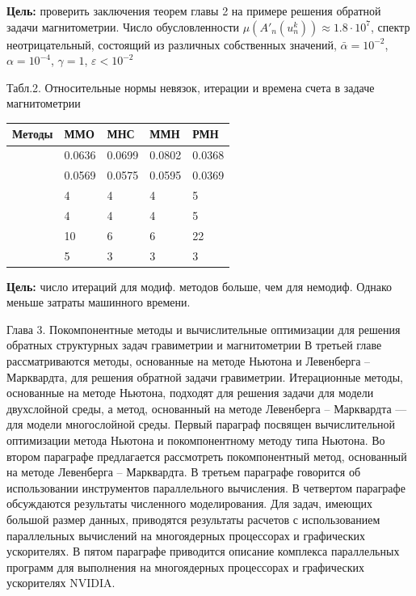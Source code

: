 \documentclass[10pt,pdf, mathserif, hyperref={unicode}]{beamer}
\begin{document}
\begin{frame}{}
	\textbf{\color{blue}Цель:} проверить заключения теорем главы 2 на примере решения обратной задачи магнитометрии.
	Число обусловленности $\mu(A'_n(u_n^k))\approx 1.8\cdot 10^7$, спектр неотрицательный, состоящий из различных собственных значений, $\bar\alpha=10^{-2}$, $\alpha = 10^{-4}$, $\gamma=1$, $\varepsilon < 10^{-2}$
	
	\begin{table}
		\centering
		{\scriptsize Табл.2. Относительные нормы невязок, итерации и времена счета в задаче магнитометрии}
		
		\smallskip
		\begin{tabular}{|p{}|p{}|p{}|p{}|p{}|}
			\hline
			\rule{0cm}{0.5cm}
			Методы & ММО & МНС & ММН & РМН \\ \hline
			\rule{0cm}{0.5cm}
			\multirow{$\Delta$} & 0.0636 & 0.0699 & 0.0802 & 0.0368	 \\ \cline{2-5} 
			\rule{0cm}{0.5cm}
			&  0.0569   & 0.0575    &  0.0595   &  0.0369   \\ \hline
			\rule{0cm}{0.5cm}
			\multirow{$N$} & 4  &  4   &   4  &  5    \\ \cline{2-5}
			\rule{0cm}{0.5cm}
			&  4   &   4  &  4   &  5   \\ \hline
			\rule{0cm}{0.5cm}
			\multirow{$T$ (сек)}    &  10   &  6   &  6  & 22    \\ \cline{2-5}
			\rule{0cm}{0.5cm}
			& 5    & 3    &  3   &   3  \\ \hline
		\end{tabular}
	\end{table}
	\textbf{\color{blue}Цель:} число итераций для модиф. методов больше, чем для немодиф. Однако меньше затраты машинного времени.
\end{frame}
\begin{frame}{Глава 3. Покомпонентные методы и вычислительные оптимизации для решения обратных структурных задач гравиметрии и магнитометрии}
	В третьей главе рассматриваются методы, основанные на методе Ньютона и Левенберга -- Марквардта, для решения обратной задачи гравиметрии. Итерационные методы, основанные на методе Ньютона, подходят для решения задачи для модели двухслойной среды, а метод, основанный на методе Левенберга -- Марквардта --- для модели многослойной среды. Первый параграф посвящен вычислительной оптимизации метода Ньютона и покомпонентному методу типа Ньютона. Во втором параграфе предлагается рассмотреть покомпонентный метод, основанный на методе Левенберга -- Марквардта. В третьем параграфе говорится об использовании инструментов параллельного вычисления. В четвертом параграфе обсуждаются результаты численного моделирования. Для задач, имеющих большой размер данных, приводятся результаты расчетов с использованием параллельных вычислений на многоядерных процессорах и графических ускорителях. В пятом параграфе приводится описание комплекса параллельных программ для выполнения на многоядерных процессорах и графических ускорителях NVIDIA.
\end{frame}
\end{document}

